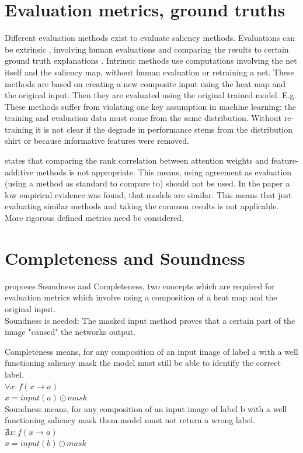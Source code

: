 \section{Evaluation metrics, ground truths \cite{gupta2022new}}

Different evaluation methods exist to evaluate saliency methods. Evaluations can be extrinsic \cite{gupta2022new}, involving human evaluations and comparing the results to certain ground truth explanations \cite{article}. Intrinsic methods use computations involving the net itself and the saliency map, without human evaluation or retraining a net. These methods are based on creating a new composite input using the heat map and the original input. Then they are evaluated using the original trained model.  E.g.\cite{dabkowski2017real} These methods suffer from violating one key assumption in machine learning: the training and evaluation data must come from the same distribution. \cite{hooker2019benchmark} Without re-training it is not clear if the degrade in performance stems from the distribution shirt or because informative features were removed.

\cite{neely2021order} states that comparing the rank correlation between attention weights and feature-additive methods is not appropriate. This means, using agreement as evaluation (using a method as standard to compare to) should not be used. In the paper a low empirical evidence was found, that models are similar. This means that just evaluating similar methods and taking the common results is not applicable. More rigorous defined metrics need be considered.


\section{Completeness and Soundness}

\cite{gupta2022new} proposes Soundness and Completeness, two concepts which are required for evaluation metrics which involve using a composition of a heat map and the original input.\\
Soundness is needed: The masked input method proves that a certain part of the image "caused" the networks output. 

Completeness means, for any composition of an input image of label a with a well functioning saliency mask the model must still be able to identify the correct label.\\
$ \forall x: f(x\rightarrow a)$\\
$ x = input(a) \odot mask$\\
Soundness means, for any composition of an input image of label b with a well functioning saliency mask them model must not return a wrong label.\\
$ \nexists x: f(x\rightarrow a)$\\
$ x = input(b) \odot mask$

